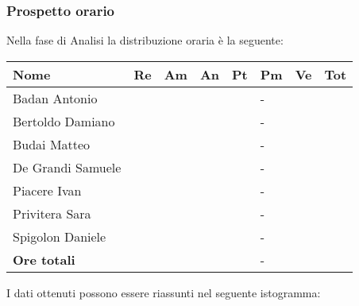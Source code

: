 \subsubsection{Prospetto orario}
Nella fase di Analisi la distribuzione oraria è la seguente:
\begin{center}
	\begin{longtable}{|p{}|p{}|p{}|p{}|p{}|p{}|p{}|p{}|}
		\hline
		\rowcolor{lighter-grayer}
		\centering\textbf{Nome} & \centering\textbf{Re} & \centering\textbf{Am} & \centering\textbf{An} &  \centering\textbf{Pt}&  \centering\textbf{Pm}&  \centering\textbf{Ve} & \textbf{Tot}\\
		\hline
		\endfirsthead
		
		\hline
		\centering Badan Antonio & \centering & \centering & \centering & \centering & \centering - & \centering &\\
		\hline
		\centering Bertoldo Damiano & \centering & \centering & \centering & \centering & \centering - & \centering &\\
		\hline
		\centering Budai Matteo & \centering & \centering & \centering & \centering & \centering - & \centering &\\
		\hline
		\centering De Grandi Samuele & \centering & \centering & \centering & \centering & \centering - & \centering &\\
		 \hline
		\centering Piacere Ivan & \centering & \centering & \centering & \centering & \centering - & \centering &\\
		 \hline
		\centering Privitera Sara & \centering & \centering & \centering & \centering & \centering - & \centering &\\
		 \hline
		\centering Spigolon Daniele & \centering & \centering & \centering & \centering & \centering - & \centering &\\
		 \hline
		\centering\textbf{Ore totali}  & \centering & \centering & \centering & \centering & \centering - & \centering &\\
		\hline
		
	\end{longtable}
\end{center}

I dati ottenuti possono essere riassunti nel seguente istogramma:

